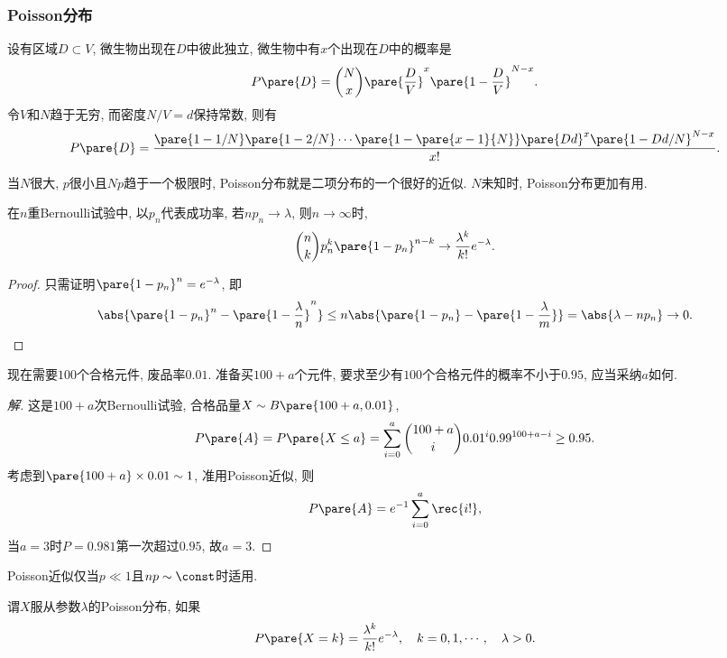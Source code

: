 \documentclass[../Statistics.tex]{subfiles}
\begin{document}
\subsubsection{Poisson分布} %
\label{ssub:poisson分布}

\begin{ex}
    设有区域$D\subset V$, 微生物出现在$D$中彼此独立, 微生物中有$x$个出现在$D$中的概率是
    \[ P\pare{D} = \binom{N}{x}\pare{\frac{D}{V}}^x\pare{1-\frac{D}{V}}^{N-x}. \]
    令$V$和$N$趋于无穷, 而密度$N/V=d$保持常数, 则有
    \[ P\pare{D} = \frac{\pare{1-1/N}\pare{1-2/N}\cdots\pare{1-\pare{x-1}{N}}\pare{Dd}^x\pare{1-Dd/N}^{N-x}}{x!}. \]
\end{ex}
当$N$很大, $p$很小且$Np$趋于一个极限时, Poisson分布就是二项分布的一个很好的近似. $N$未知时, Poisson分布更加有用.
\begin{theorem}
    在$n$重Bernoulli试验中, 以$p_n$代表成功率, 若$np_n\rightarrow \lambda$, 则$n\rightarrow \infty$时,
    \[ \binom{n}{k}p_n^k\pare{1-p_n}^{n-k} \rightarrow \frac{\lambda^k}{k!}e^{-\lambda}. \]
\end{theorem}
\begin{proof}
    只需证明$\pare{1-p_n}^n = e^{-\lambda}$, 即
    \[ \abs{\pare{1-p_n}^n - \pare{1-\frac{\lambda}{n}}^n} \le n\abs{\pare{1-p_n} - \pare{1-\frac{\lambda}{m}}} = \abs{\lambda - np_n}\rightarrow 0. \qedhere \]
\end{proof}
\begin{sample}
    \begin{ex}
        现在需要$100$个合格元件, 废品率$0.01$. 准备买$100+a$个元件, 要求至少有$100$个合格元件的概率不小于$0.95$, 应当采纳$a$如何.
    \end{ex}
    \begin{proof}[解]
        这是$100+a$次Bernoulli试验, 合格品量$X\sim B\pare{100+a,0.01}$,
        \[ P\pare{A} = P\pare{X\le a} = \sum_{i=0}^a \binom{100+a}{i}0.01^i0.99^{100+a-i} \ge 0.95. \]
        考虑到$\pare{100+a}\times 0.01\sim 1$, 准用Poisson近似, 则
        \[ P\pare{A} = e^{-1} \sum_{i=0}^a \rec{i!}, \]
        当$a=3$时$P=0.981$第一次超过$0.95$, 故$a=3$.
    \end{proof}
\end{sample}
\begin{pitfall}
    Poisson近似仅当$p\ll 1$且$np\sim \const$时适用.
\end{pitfall}
谓$X$服从参数$\lambda$的Poisson分布, 如果
\[ P\pare{X=k} = \frac{\lambda^k}{k!}e^{-\lambda},\quad k = 0,1,\cdots,\quad \lambda > 0. \]
\end{document}
